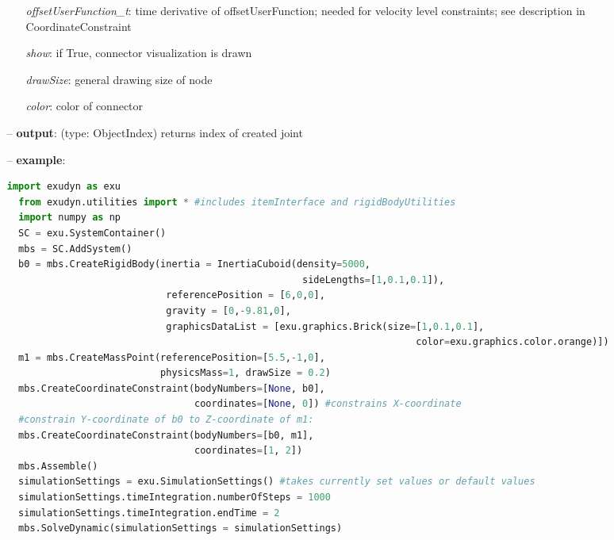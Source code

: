 \begin{itemize}[leftmargin=0.7cm]
\begin{itemize}[leftmargin=1.2cm]
\item[]{\it offsetUserFunction\_t}: time derivative of offsetUserFunction; needed for velocity level constraints; see description in CoordinateConstraint
\item[]{\it show}: if True, connector visualization is drawn
\item[]{\it drawSize}: general drawing size of node
\item[]{\it color}: color of connector
\end{itemize}
\item[--]
{\bf output}: (type: ObjectIndex) returns index of created joint
\item[--]
{\bf example}: \vspace{-12pt}\ei\begin{lstlisting}[language=Python, xleftmargin=36pt]
  import exudyn as exu
  from exudyn.utilities import * #includes itemInterface and rigidBodyUtilities
  import numpy as np
  SC = exu.SystemContainer()
  mbs = SC.AddSystem()
  b0 = mbs.CreateRigidBody(inertia = InertiaCuboid(density=5000,
                                                    sideLengths=[1,0.1,0.1]),
                            referencePosition = [6,0,0],
                            gravity = [0,-9.81,0],
                            graphicsDataList = [exu.graphics.Brick(size=[1,0.1,0.1],
                                                                        color=exu.graphics.color.orange)])
  m1 = mbs.CreateMassPoint(referencePosition=[5.5,-1,0],
                           physicsMass=1, drawSize = 0.2)
  mbs.CreateCoordinateConstraint(bodyNumbers=[None, b0],
                                 coordinates=[None, 0]) #constrains X-coordinate
  #constrain Y-coordinate of b0 to Z-coordinate of m1:
  mbs.CreateCoordinateConstraint(bodyNumbers=[b0, m1],
                                 coordinates=[1, 2])
  mbs.Assemble()
  simulationSettings = exu.SimulationSettings() #takes currently set values or default values
  simulationSettings.timeIntegration.numberOfSteps = 1000
  simulationSettings.timeIntegration.endTime = 2
  mbs.SolveDynamic(simulationSettings = simulationSettings)
\end{lstlisting}\vspace{-24pt}\bi\item[]\vspace{-24pt}\vspace{12pt}\end{itemize}
%


